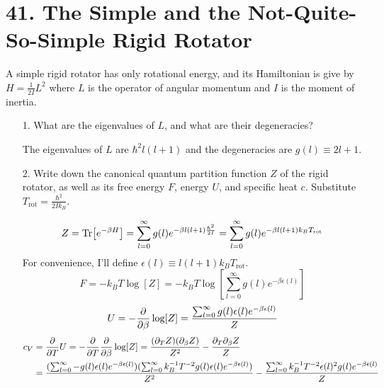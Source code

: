 \documentclass[a4paper,twoside]{article}
\begin{document}
\section*{41. The Simple and the Not-Quite-So-Simple Rigid Rotator}
A simple rigid rotator has only rotational energy, and its Hamiltonian is give by $ H = \frac{1}{2I} L^2 $ where $ L $ is the operator of angular momentum and $ I $ is the moment of inertia.
\begin{itemize}
    \item[1.] What are the eigenvalues of $ L $, and what are their degeneracies?
        \begin{problem}
            The eigenvalues of $ L $ are $ \hbar^2 l(l+1) $ and the degeneracies are $ g(l) \equiv 2l+1 $.
        \end{problem}
    \item[2.] Write down the canonical quantum partition function $ Z $ of the rigid rotator, as well as its free energy $ F $, energy $ U $, and specific heat $ c $. Substitute $ T_{\text{rot}} = \frac{\hbar^2}{2Ik_B} $.
        \begin{problem}
            \begin{equation}
                Z = \Tr[e^{- \beta H}] = \sum_{l=0}^{\infty} g(l) e^{- \beta l(l+1) \frac{\hbar^2}{2I}} =\sum_{l=0}^{\infty} g(l) e^{- \beta l(l+1) k_B T_{\text{rot}}}
            \end{equation}
            For convenience, I'll define $ \epsilon(l) \equiv l(l+1) k_B T_{\text{rot}} $.
            \begin{equation}
                F = - k_B T \log[Z] = -k_B T \log[\sum_{l=0}^{\infty} g(l) e^{- \beta \epsilon(l)}]
            \end{equation}
            \begin{equation}
                U = - \pdv{\beta} \log[Z] = \frac{\sum_{l=0}^{\infty} g(l) \epsilon(l) e^{- \beta \epsilon(l)}}{Z}
            \end{equation}
            \begin{align}
                c_V &= \pdv{T}U = - \pdv{T} \pdv{\beta} \log[Z] = \frac{(\partial_T Z)(\partial_{\beta} Z)}{Z^2} - \frac{\partial_T \partial_{\beta} Z}{Z} \\
                &= \frac{(\sum_{l=0}^{\infty} - g(l) \epsilon(l) e^{- \beta \epsilon(l)})(\sum_{l=0}^{\infty} k_B^{-1} T^{-2} g(l) \epsilon(l) e^{- \beta \epsilon(l)})}{Z^2} - \frac{\sum_{l=0}^{\infty} k_B^{-1} T^{-2} \epsilon(l)^2 g(l) e^{- \beta \epsilon(l)}}{Z}
            \end{align}

\end{problem}
\end{itemize}
\end{document}
